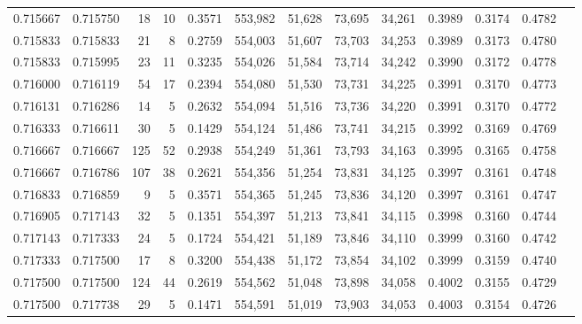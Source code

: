 \begin{tabular}{rrrrrrrrrrrrr}
0.715667 & 0.715750 &    18 &  10 &                                     0.3571 & 553,982 &  51,628 &  73,695 &  34,261 & 0.3989 & 0.3174 & 0.4782 \\
0.715833 & 0.715833 &    21 &   8 &                                     0.2759 & 554,003 &  51,607 &  73,703 &  34,253 & 0.3989 & 0.3173 & 0.4780 \\
0.715833 & 0.715995 &    23 &  11 &                                     0.3235 & 554,026 &  51,584 &  73,714 &  34,242 & 0.3990 & 0.3172 & 0.4778 \\
0.716000 & 0.716119 &    54 &  17 &                                     0.2394 & 554,080 &  51,530 &  73,731 &  34,225 & 0.3991 & 0.3170 & 0.4773 \\
0.716131 & 0.716286 &    14 &   5 &                                     0.2632 & 554,094 &  51,516 &  73,736 &  34,220 & 0.3991 & 0.3170 & 0.4772 \\
0.716333 & 0.716611 &    30 &   5 &                                     0.1429 & 554,124 &  51,486 &  73,741 &  34,215 & 0.3992 & 0.3169 & 0.4769 \\
0.716667 & 0.716667 &   125 &  52 &                                     0.2938 & 554,249 &  51,361 &  73,793 &  34,163 & 0.3995 & 0.3165 & 0.4758 \\
0.716667 & 0.716786 &   107 &  38 &                                     0.2621 & 554,356 &  51,254 &  73,831 &  34,125 & 0.3997 & 0.3161 & 0.4748 \\
0.716833 & 0.716859 &     9 &   5 &                                     0.3571 & 554,365 &  51,245 &  73,836 &  34,120 & 0.3997 & 0.3161 & 0.4747 \\
0.716905 & 0.717143 &    32 &   5 &                                     0.1351 & 554,397 &  51,213 &  73,841 &  34,115 & 0.3998 & 0.3160 & 0.4744 \\
0.717143 & 0.717333 &    24 &   5 &                                     0.1724 & 554,421 &  51,189 &  73,846 &  34,110 & 0.3999 & 0.3160 & 0.4742 \\
0.717333 & 0.717500 &    17 &   8 &                                     0.3200 & 554,438 &  51,172 &  73,854 &  34,102 & 0.3999 & 0.3159 & 0.4740 \\
0.717500 & 0.717500 &   124 &  44 &                                     0.2619 & 554,562 &  51,048 &  73,898 &  34,058 & 0.4002 & 0.3155 & 0.4729 \\
0.717500 & 0.717738 &    29 &   5 &                                     0.1471 & 554,591 &  51,019 &  73,903 &  34,053 & 0.4003 & 0.3154 & 0.4726 \\

\end{tabular}
